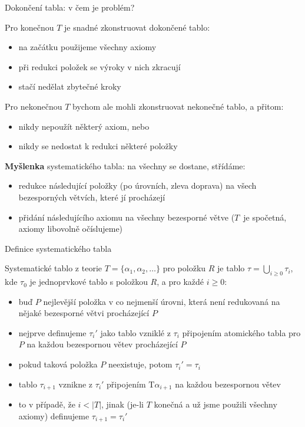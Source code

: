 \documentclass{beamer}
\begin{document}
\begin{frame}{Dokončení tabla: v čem je problém?}

    \pause
    Pro konečnou $T$ je snadné zkonstruovat dokončené tablo:\pause
    \begin{itemize}
        \item na začátku použijeme všechny axiomy\pause
        \item při redukci položek se výroky v nich zkracují\pause
        \item stačí nedělat zbytečné kroky\pause
    \end{itemize}

    Pro \alert{nekonečnou} $T$ bychom ale mohli zkonstruovat nekonečné tablo, a přitom:\pause
    \begin{itemize}
        \item nikdy nepoužít některý axiom, nebo\pause
        \item nikdy se nedostat k redukci některé položky
    \end{itemize}
    
    \pause
    \textbf{Myšlenka} \alert{systematického tabla}: na všechny se dostane, střídáme:\pause
    \begin{itemize}
        \item \alert{redukce následující položky} (po úrovních, zleva doprava) na všech bezesporných větvích, které jí procházejí \pause
        \item \alert{přidání následujícího axiomu} na všechny bezesporné větve ($T$~je spočetná, axiomy libovolně očíslujeme)         
    \end{itemize}

\end{frame}


\begin{frame}{Definice systematického tabla}
 
    \alert{Systematické tablo} z teorie $T=\{\alpha_1,\alpha_2,\dots\}$ pro položku $R$ je tablo $\tau=\bigcup_{i\geq 0}\tau_i$, kde $\tau_0$ je jednoprvkové tablo s položkou $R$, a pro každé $i\geq 0$:\pause

    \begin{itemize}[<+->]
        \item buď $P$ nejlevější položka v co nejmenší úrovni, která není redukovaná na nějaké bezesporné větvi procházející $P$
        \item nejprve definujeme $\tau_i'$ jako tablo vzniklé z $\tau_i$ připojením atomického tabla pro $P$ na každou bezespornou větev procházející $P$
        \item pokud taková položka $P$ neexistuje, potom $\tau_i'=\tau_i$
        \item tablo $\tau_{i+1}$ vznikne z $\tau_i'$ připojením $\mathrm{T}\alpha_{i+1}$ na každou bezespornou větev
        \item to v případě, že $i<|T|$, jinak (je-li $T$ konečná a už jsme použili všechny axiomy) definujeme $\tau_{i+1}=\tau_i'$
    \end{itemize}  

\end{frame}
\end{document}
